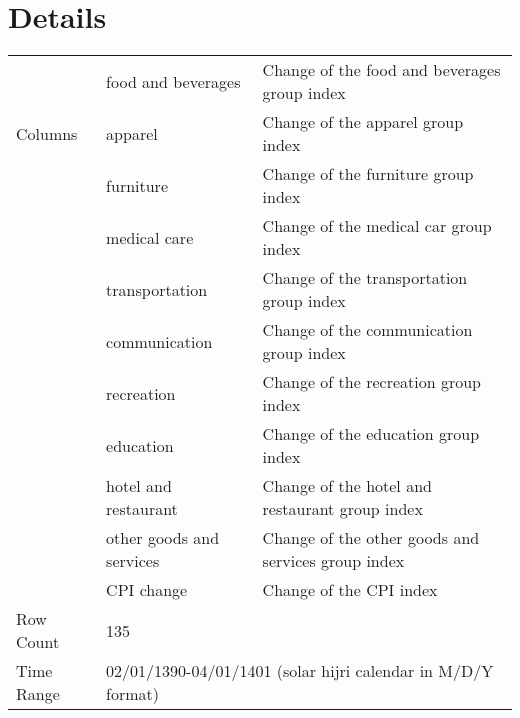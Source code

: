 \documentclass[fleqn]{report}
\begin{document}
\section*{Details}
\begin{center}
    \begin{tabular}{|l|ll|}
        \hline
        \multirow{3}{*}{Columns} & \multicolumn{1}{l|}{food and beverages}       & Change of the food and beverages group index                            \\ \cline{2-3} 
                                 & \multicolumn{1}{l|}{apparel}  & Change of the apparel group index      \\ \cline{2-3}
                                 & \multicolumn{1}{l|}{furniture}  & Change of the furniture group index      \\ \cline{2-3}
                                 & \multicolumn{1}{l|}{medical care}  & Change of the medical car group index    \\ \cline{2-3}
                                 & \multicolumn{1}{l|}{transportation}  & Change of the transportation group index      \\ \cline{2-3}
                                 & \multicolumn{1}{l|}{communication}  & Change of the communication group index      \\ \cline{2-3}
                                 & \multicolumn{1}{l|}{recreation}  & Change of the recreation group index      \\ \cline{2-3}
                                 & \multicolumn{1}{l|}{education}  & Change of the education group index      \\ \cline{2-3}
                                 & \multicolumn{1}{l|}{hotel and restaurant}  & Change of the hotel and restaurant group index      \\ \cline{2-3}
                                 & \multicolumn{1}{l|}{other goods and services}  & Change of the other goods and services group index      \\ \cline{2-3}
                                 & \multicolumn{1}{l|}{CPI change}  & Change of the CPI index      \\ \cline{2-3} \hline
        Row Count                & \multicolumn{2}{l|}{135}                                                        \\ \hline
        Time Range               & \multicolumn{2}{l|}{02/01/1390-04/01/1401 (solar hijri calendar in M/D/Y format)}                         \\ \hline
    \end{tabular}
\end{center}
\end{document}
